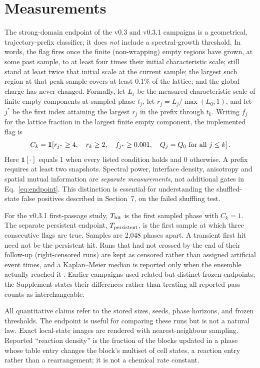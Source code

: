 \documentclass[11pt,a4paper]{article}
\begin{document}
\section{Measurements}
The strong-domain endpoint of the v0.3 and v0.3.1 campaigns is a geometrical, trajectory-prefix classifier; it does \emph{not} include a spectral-growth threshold. In words, the flag fires once the finite (non-wrapping) empty regions have grown, at some past sample, to at least four times their initial characteristic scale; still stand at least twice that initial scale at the current sample; the largest such region at that peak sample covers at least 0.1\% of the lattice; and the global charge has never changed. Formally, let $L_j$ be the measured characteristic scale of finite empty components at sampled phase $t_j$, let $r_j=L_j/\max(L_0,1)$, and let $j^*$ be the first index attaining the largest $r_j$ in the prefix through $t_k$. Writing $f_j$ for the lattice fraction in the largest finite empty component, the implemented flag is
\begin{equation}
 C_k=\mathbf{1}\!\left[
 r_{j^*}\geq4,\quad r_k\geq2,\quad f_{j^*}\geq0.001,
 \quad Q_j=Q_0\ \hbox{for all }j\leq k\right].
 \label{eq:endpoint}
\end{equation}
Here $\mathbf{1}[\cdot]$ equals 1 when every listed condition holds and 0 otherwise. A prefix requires at least two snapshots. Spectral power, interface density, anisotropy and spatial mutual information are \emph{separate measurements}, not additional gates in Eq.~\ref{eq:endpoint}. This distinction is essential for understanding the shuffled-state false positives described in Section~7, on the failed shuffling test.

For the v0.3.1 first-passage study, $T_{\rm hit}$ is the first sampled phase with $C_k=1$. The separate persistent endpoint, $T_{\rm persistent}$, is the first sample at which three consecutive flags are true. Samples are 2,048 phases apart. A transient first hit need not be the persistent hit. Runs that had not crossed by the end of their follow-up (right-censored runs) are kept as censored rather than assigned artificial event times, and a Kaplan--Meier median is reported only when the ensemble actually reached it \citep{KaplanMeier1958,RoystonParmar2013}. Earlier campaigns used related but distinct frozen endpoints; the Supplement states their differences rather than treating all reported pass counts as interchangeable.

All quantitative claims refer to the stored sizes, seeds, phase horizons, and frozen thresholds. The endpoint is useful for comparing these runs but is not a natural law. Exact local-state images are rendered with nearest-neighbour sampling. Reported ``reaction density'' is the fraction of the blocks updated in a phase whose table entry changes the block's multiset of cell states, a reaction entry rather than a rearrangement; it is not a chemical rate constant.
\end{document}
